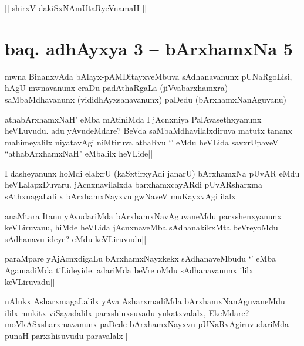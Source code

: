 \begin{center}
|| shirxV dakiSxNAmUtaRyeVnamaH ||
\end{center}

\section*{baq. adhAyxya 3 -- bArxhamxNa 5}

\begin{artha}%
mwna BinanxvAda bAlayx-pAMDitayxveMbuva sAdhanavanunx pUNaRgoLisi, hAgU mwnavanunx eraDu padAthaRgaLa (jiVvabarxhamxra) saMbaMdhavanunx (vididhAyxsanavanunx) paDedu (bArxhamxNanAguvanu)
\end{artha}


\begin{artha}
athabArxhamxNaH' eMba mAtiniMda I jAcnxniya PalAvasethxyanunx heVLuvudu. adu yAvudeMdare? BeVda saMbaMdhavilalxdiruva matutx tananx mahimeyalilx niyatavAgi niMtiruva athaRvu `\stext ' eMdu heVLida savxrUpaveV ``athabArxhamxNaH" eMbalilx heVLide||
\end{artha}


\begin{artha}
I dasheyanunx hoMdi elalxrU (kaSxtirxyAdi janarU) bArxhamxNa pUvAR eMdu heVLalapxDuvaru. jAcnxnavilalxda barxhamxcayARdi pUvARsharxma sAthxnagaLalilx bArxhamxNayxvu gwNaveV muKayxvAgi ilalx||
\end{artha}


\begin{artha}
anaMtara Itanu yAvudariMda bArxhamxNavAguvaneMdu parxshenxyanunx keVLiruvanu, hiMde heVLida jAcnxnaveMba sAdhanakikxMta beVreyoMdu sAdhanavu ideye? eMdu keVLiruvudu||
\end{artha}


\begin{artha}
paraMpare yAjAcnxdigaLu bArxhamxNayxkekx sAdhanaveMbudu `\stext ' eMba AgamadiMda tiLideyide. adariMda beVre oMdu sAdhanavanunx ililx keVLiruvadu||
\end{artha}

\begin{artha}
nAlukx AsharxmagaLalilx yAva AsharxmadiMda bArxhamxNanAguvaneMdu ililx mukitx viSayadalilx parxshinxsuvadu yukatxvalalx, EkeMdare? moVkASxsharxmavanunx paDede bArxhamxNayxvu pUNaRvAgiruvudariMda punaH parxshisuvudu paravalalx||
\end{artha}

